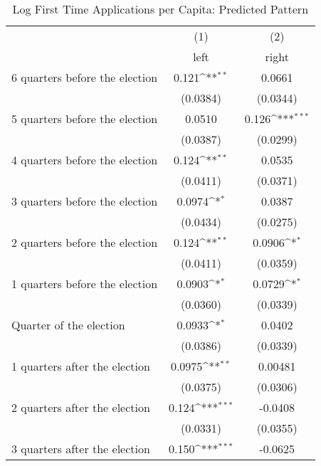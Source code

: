 \begin{table}[htbp]\centering
\def\sym#1{\ifmmode^{#1}\else\(^{#1}\)\fi}
\caption{Log First Time Applications per Capita: Predicted Pattern}
\begin{tabular}{l*{2}{c}}
\hline\hline
                    &\multicolumn{1}{c}{(1)}&\multicolumn{1}{c}{(2)}\\
                    &\multicolumn{1}{c}{left}&\multicolumn{1}{c}{right}\\
\hline
 6 quarters before the election&       0.121\sym{**} &      0.0661         \\
                    &    (0.0384)         &    (0.0344)         \\
[1em]
 5 quarters before the election&      0.0510         &       0.126\sym{***}\\
                    &    (0.0387)         &    (0.0299)         \\
[1em]
 4 quarters before the election&       0.124\sym{**} &      0.0535         \\
                    &    (0.0411)         &    (0.0371)         \\
[1em]
 3 quarters before the election&      0.0974\sym{*}  &      0.0387         \\
                    &    (0.0434)         &    (0.0275)         \\
[1em]
 2 quarters before the election&       0.124\sym{**} &      0.0906\sym{*}  \\
                    &    (0.0411)         &    (0.0359)         \\
[1em]
 1 quarters before the election&      0.0903\sym{*}  &      0.0729\sym{*}  \\
                    &    (0.0360)         &    (0.0339)         \\
[1em]
Quarter of the election&      0.0933\sym{*}  &      0.0402         \\
                    &    (0.0386)         &    (0.0339)         \\
[1em]
 1 quarters after the election&      0.0975\sym{**} &     0.00481         \\
                    &    (0.0375)         &    (0.0306)         \\
[1em]
 2 quarters after the election&       0.124\sym{***}&     -0.0408         \\
                    &    (0.0331)         &    (0.0355)         \\
[1em]
 3 quarters after the election&       0.150\sym{***}&     -0.0625         \\

\end{tabular}
\end{table}
